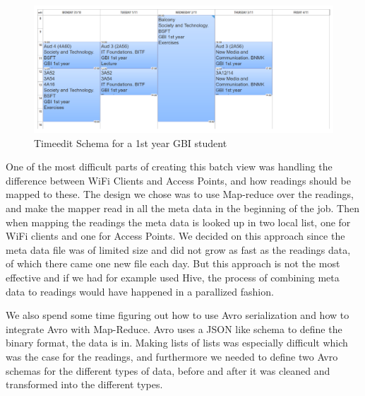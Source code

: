 \begin{figure}[H]
	\centering
	\includegraphics[width=\linewidth]{figures/schema-from-timeedit.png}
	\caption{Timeedit Schema for a 1st year GBI student}
	\label{fig:timeedit_schema}
\end{figure}

\newpar One of the most difficult parts of creating this batch view was handling the difference between WiFi Clients and Access Points, and how readings should be mapped to these. The design we chose was to use Map-reduce over the readings, and make the mapper read in all the meta data in the beginning of the job. Then when mapping the readings the meta data is looked up in two local list, one for WiFi clients and one for Access Points. We decided on this approach since the meta data file was of limited size and did not grow as fast as the readings data, of which there came one new file each day. But this approach is not the most effective and if we had for example used Hive, the process of combining meta data to readings would have happened in a parallized fashion.

\newpar We also spend some time figuring out how to use Avro serialization and how to integrate Avro with Map-Reduce. Avro uses a JSON like schema to define the binary format, the data is in. Making lists of lists was especially difficult which was the case for the readings, and furthermore we needed to define two Avro schemas for the different types of data, before and after it was cleaned and transformed into the different types.